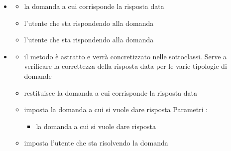 \begin{itemize}
\item {}
\begin{itemize}
\item {}
\newline
la domanda a cui corrisponde la risposta data
\item {}
\newline
l'utente che sta rispondendo alla domanda
\item {}
\newline
l'utente che sta rispondendo alla domanda
\end{itemize}
\item {}
\begin{itemize}
\item {}
\newline
il metodo è astratto e verrà concretizzato nelle sottoclassi. Serve a verificare la correttezza della risposta data per le varie tipologie di domande
\newline
\item {}
\newline
restituisce la domanda a cui corrisponde la risposta data
\newline
\item {}
\newline
imposta la domanda a cui si vuole dare risposta
\newline
Parametri :
\begin{itemize}
\item {}
\newline
la domanda a cui si vuole dare risposta
\end{itemize}
\item {}
\newline
imposta l'utente che sta risolvendo la domanda
\newline
\end{itemize}
\end{itemize}

